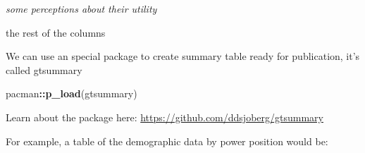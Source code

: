 \documentclass[
]{article}
\newenvironment{Shaded}{\begin{snugshade}}{\end{snugshade}}
\newcommand{\CommentTok}[1]{\textcolor[rgb]{0.56,0.35,0.01}{\textit{#1}}}
\newcommand{\DataTypeTok}[1]{\textcolor[rgb]{0.13,0.29,0.53}{#1}}
\newcommand{\KeywordTok}[1]{\textcolor[rgb]{0.13,0.29,0.53}{\textbf{#1}}}
\newcommand{\NormalTok}[1]{#1}
\newcommand{\OperatorTok}[1]{\textcolor[rgb]{0.81,0.36,0.00}{\textbf{#1}}}
\newcommand{\StringTok}[1]{\textcolor[rgb]{0.31,0.60,0.02}{#1}}
\begin{document}
\emph{some perceptions about their utility}

the rest of the columns

We can use an special package to create summary table ready for
publication, it's called gtsummary

\begin{Shaded}
\begin{Highlighting}[]
\NormalTok{pacman}\OperatorTok{::}\KeywordTok{p_load}\NormalTok{(gtsummary)}
\end{Highlighting}
\end{Shaded}

Learn about the package here:
\url{https://github.com/ddsjoberg/gtsummary}

For example, a table of the demographic data by power position would be:

\begin{Shaded}
\end{Shaded}
\end{document}
